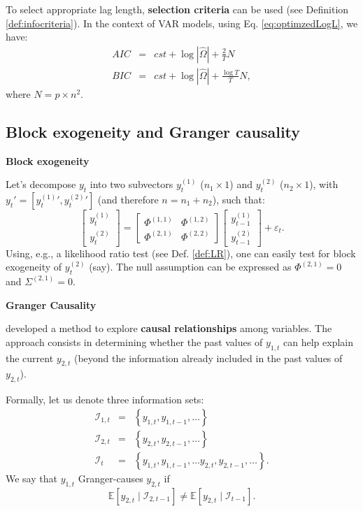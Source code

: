 \documentclass[
  12pt,
]{book}
\theoremstyle{definition}
\theoremstyle{definition}
\theoremstyle{definition}
\theoremstyle{definition}
\theoremstyle{remark}
\begin{document}
To select appropriate lag length, \textbf{selection criteria} can be used (see Definition \ref{def:infocriteria}). In the context of VAR models, using Eq. \eqref{eq:optimzedLogL}, we have:
\begin{eqnarray*}
AIC & = & cst + \log\left|\hat{\Omega}\right|+\frac{2}{T}N\\
BIC & = & cst + \log\left|\hat{\Omega}\right|+\frac{\log T}{T}N,
\end{eqnarray*}
where \(N=p \times n^{2}\).

\hypertarget{BlockGranger}{%
\subsection{Block exogeneity and Granger causality}\label{BlockGranger}}

\textbf{Block exogeneity}

Let's decompose \(y_t\) into two subvectors \(y^{(1)}_{t}\) (\(n_1 \times 1\)) and \(y^{(2)}_{t}\) (\(n_2 \times 1\)), with \(y_t' = [{y^{(1)}_{t}}',{y^{(2)}_{t}}']\) (and therefore \(n=n_1 +n_2\)), such that:
\[
\left[
\begin{array}{c}
y^{(1)}_{t}\\
y^{(2)}_{t}
\end{array}
\right] = \left[
\begin{array}{cc}
\Phi^{(1,1)} & \Phi^{(1,2)}\\
\Phi^{(2,1)} & \Phi^{(2,2)}
\end{array}
\right]
\left[
\begin{array}{c}
y^{(1)}_{t-1}\\
y^{(2)}_{t-1}
\end{array}
\right] + \varepsilon_t.
\]
Using, e.g., a likelihood ratio test (see Def. \ref{def:LR}), one can easily test for block exogeneity of \(y_t^{(2)}\) (say). The null assumption can be expressed as \(\Phi^{(2,1)}=0\) and \(\Sigma^{(2,1)}=0\).

\textbf{Granger Causality}

\citet{Granger_1969} developed a method to explore \textbf{causal relationships} among variables. The approach consists in determining whether the past values of \(y_{1,t}\) can help explain the current \(y_{2,t}\) (beyond the information already included in the past values of \(y_{2,t}\)).

Formally, let us denote three information sets:
\begin{eqnarray*}
\mathcal{I}_{1,t} & = & \left\{ y_{1,t},y_{1,t-1},\ldots\right\} \\
\mathcal{I}_{2,t} & = & \left\{ y_{2,t},y_{2,t-1},\ldots\right\} \\
\mathcal{I}_{t} & = & \left\{ y_{1,t},y_{1,t-1},\ldots y_{2,t},y_{2,t-1},\ldots\right\}.
\end{eqnarray*}
We say that \(y_{1,t}\) Granger-causes \(y_{2,t}\) if
\[
\mathbb{E}\left[y_{2,t}\mid \mathcal{I}_{2,t-1}\right]\neq \mathbb{E}\left[y_{2,t}\mid \mathcal{I}_{t-1}\right].
\]
\end{document}
